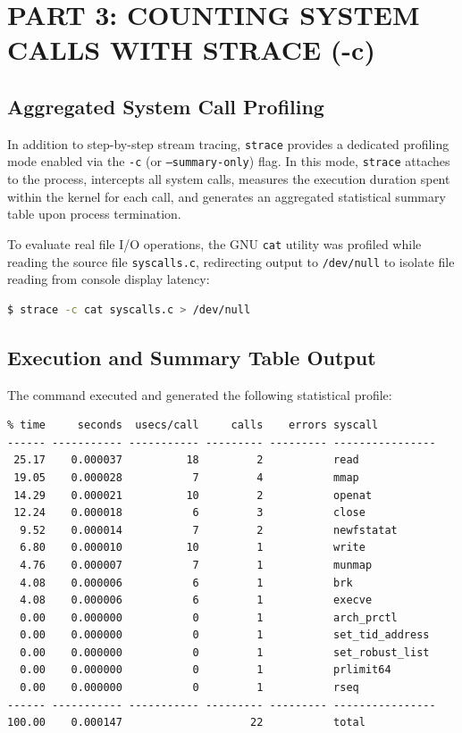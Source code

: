 \documentclass[12pt,a4paper]{report}
\numberwithin{equation}{chapter}
\numberwithin{figure}{chapter}
\numberwithin{table}{chapter}
\begin{document}
\chapter{PART 3: COUNTING SYSTEM CALLS WITH STRACE (-c)}

\section{Aggregated System Call Profiling}
In addition to step-by-step stream tracing, \texttt{strace} provides a dedicated profiling mode enabled via the \texttt{-c} (or \texttt{--summary-only}) flag. In this mode, \texttt{strace} attaches to the process, intercepts all system calls, measures the execution duration spent within the kernel for each call, and generates an aggregated statistical summary table upon process termination.

To evaluate real file I/O operations, the GNU \texttt{cat} utility was profiled while reading the source file \texttt{syscalls.c}, redirecting output to \texttt{/dev/null} to isolate file reading from console display latency:

\begin{lstlisting}[language=bash]
$ strace -c cat syscalls.c > /dev/null
\end{lstlisting}

\section{Execution and Summary Table Output}
The command executed and generated the following statistical profile:

\begin{lstlisting}
% time     seconds  usecs/call     calls    errors syscall
------ ----------- ----------- --------- --------- ----------------
 25.17    0.000037          18         2           read
 19.05    0.000028           7         4           mmap
 14.29    0.000021          10         2           openat
 12.24    0.000018           6         3           close
  9.52    0.000014           7         2           newfstatat
  6.80    0.000010          10         1           write
  4.76    0.000007           7         1           munmap
  4.08    0.000006           6         1           brk
  4.08    0.000006           6         1           execve
  0.00    0.000000           0         1           arch_prctl
  0.00    0.000000           0         1           set_tid_address
  0.00    0.000000           0         1           set_robust_list
  0.00    0.000000           0         1           prlimit64
  0.00    0.000000           0         1           rseq
------ ----------- ----------- --------- --------- ----------------
100.00    0.000147                    22           total
\end{lstlisting}
\end{document}
